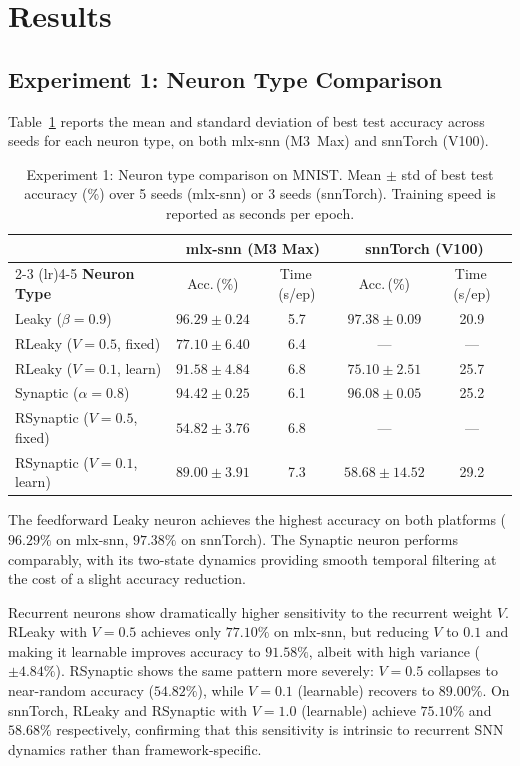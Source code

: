 \documentclass[11pt]{article}
\begin{document}
\section{Results}

\subsection{Experiment 1: Neuron Type Comparison}

Table~\ref{tab:exp1} reports the mean and standard deviation of best test accuracy across seeds for each neuron type, on both mlx-snn (M3~Max) and snnTorch (V100).

\begin{table}[H]
\centering
\caption{Experiment 1: Neuron type comparison on MNIST. Mean $\pm$ std of best test accuracy (\%) over 5 seeds (mlx-snn) or 3 seeds (snnTorch). Training speed is reported as seconds per epoch.}
\label{tab:exp1}
\small
\begin{tabular}{lcccc}
\toprule
& \multicolumn{2}{c}{\textbf{mlx-snn (M3 Max)}} & \multicolumn{2}{c}{\textbf{snnTorch (V100)}} \\
\cmidrule(lr){2-3} \cmidrule(lr){4-5}
\textbf{Neuron Type} & Acc.\,(\%) & Time\,(s/ep) & Acc.\,(\%) & Time\,(s/ep) \\
\midrule
Leaky ($\beta=0.9$) & $96.29 \pm 0.24$ & 5.7 & $97.38 \pm 0.09$ & 20.9 \\
RLeaky ($V=0.5$, fixed) & $77.10 \pm 6.40$ & 6.4 & --- & --- \\
RLeaky ($V=0.1$, learn) & $91.58 \pm 4.84$ & 6.8 & $75.10 \pm 2.51$ & 25.7 \\
Synaptic ($\alpha{=}0.8$) & $94.42 \pm 0.25$ & 6.1 & $96.08 \pm 0.05$ & 25.2 \\
RSynaptic ($V=0.5$, fixed) & $54.82 \pm 3.76$ & 6.8 & --- & --- \\
RSynaptic ($V=0.1$, learn) & $89.00 \pm 3.91$ & 7.3 & $58.68 \pm 14.52$ & 29.2 \\
\bottomrule
\end{tabular}
\end{table}

The feedforward Leaky neuron achieves the highest accuracy on both platforms ($96.29\%$ on mlx-snn, $97.38\%$ on snnTorch). The Synaptic neuron performs comparably, with its two-state dynamics providing smooth temporal filtering at the cost of a slight accuracy reduction.

Recurrent neurons show dramatically higher sensitivity to the recurrent weight $V$. RLeaky with $V=0.5$ achieves only $77.10\%$ on mlx-snn, but reducing $V$ to $0.1$ and making it learnable improves accuracy to $91.58\%$, albeit with high variance ($\pm 4.84\%$). RSynaptic shows the same pattern more severely: $V=0.5$ collapses to near-random accuracy ($54.82\%$), while $V=0.1$ (learnable) recovers to $89.00\%$. On snnTorch, RLeaky and RSynaptic with $V=1.0$ (learnable) achieve $75.10\%$ and $58.68\%$ respectively, confirming that this sensitivity is intrinsic to recurrent SNN dynamics rather than framework-specific.
\end{document}

